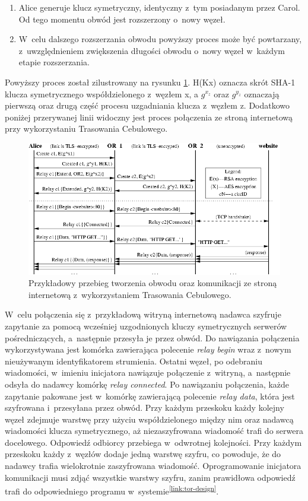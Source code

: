 \begin{enumerate}
 \item Alice generuje klucz symetryczny, identyczny z~tym posiadanym przez Carol. Od tego momentu obwód jest rozszerzony o~nowy węzeł.
 \item W~celu dalszego rozszerzania obwodu powyższy proces może być powtarzany, z~uwzględnieniem zwiększenia długości obwodu o~nowy węzeł w~każdym etapie rozszerzania.
\end{enumerate}

Powyższy proces został zilustrowany na rysunku \ref{rys:circuit}. H(Kx) oznacza skrót SHA-1 klucza symetrycznego współdzielonego z~węzłem x, a $g^{x_z}$ oraz $g^{y_z}$ oznaczają pierwszą oraz drugą część procesu uzgadniania klucza z~węzłem z. Dodatkowo poniżej przerywanej linii widoczny jest proces połączenia ze stroną internetową przy wykorzystaniu Trasowania Cebulowego. 

\begin{figure}
 \centering
 \includegraphics[width=\textwidth]{interaction}
 \caption[Caption for LOR]{Przykładowy przebieg tworzenia obwodu oraz komunikacji ze stroną internetową z~wykorzystaniem Trasowania Cebulowego.\footnotemark}
 \label{rys:circuit}
\end{figure}

W~celu połączenia się z~przykładową witryną internetową nadawca szyfruje zapytanie za pomocą wcześniej uzgodnionych kluczy symetrycznych serwerów pośredniczących, a~następnie przesyła je przez obwód. Do nawiązania połączenia wykorzystywana jest komórka zawierająca polecenie \textit{relay begin} wraz z~nowym nieużywanym identyfikatorem strumienia. Ostatni węzeł, po odebraniu wiadomości, w~imieniu inicjatora nawiązuje połączenie z~witryną, a~następnie odsyła do nadawcy komórkę \textit{relay connected}. Po nawiązaniu połączenia, każde zapytanie pakowane jest w~komórkę zawierającą polecenie \textit{relay data}, która jest szyfrowana i~przesyłana przez obwód. Przy każdym przeskoku każdy kolejny węzeł zdejmuje warstwę przy użyciu współdzielonego między nim oraz nadawcą wiadomości klucza symetrycznego, aż niezaszyfrowana wiadomość trafi do serwera docelowego. Odpowiedź odbiorcy przebiega w~odwrotnej kolejności. Przy każdym przeskoku każdy z~węzłów dodaje jedną warstwę szyfru, co powoduje, że do nadawcy trafia wielokrotnie zaszyfrowana wiadomość. Oprogramowanie inicjatora komunikacji musi zdjąć wszystkie warstwy szyfru, zanim prawidłowa odpowiedź trafi do odpowiedniego programu w~systemie\textsuperscript{\ref{link:tor-design}}.

